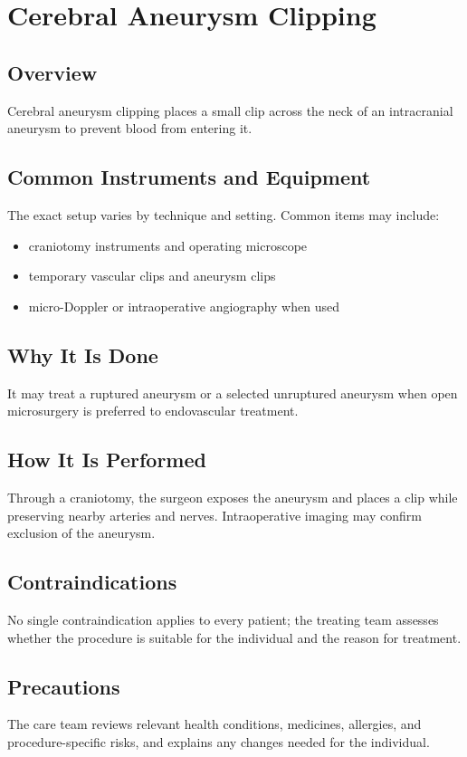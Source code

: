 \chapter{Cerebral Aneurysm Clipping}
\section*{Overview}
Cerebral aneurysm clipping places a small clip across the neck of an intracranial aneurysm to prevent blood from entering it.
\section*{Common Instruments and Equipment}
The exact setup varies by technique and setting. Common items may include:
\begin{itemize}[nosep,leftmargin=*]
  \item craniotomy instruments and operating microscope
  \item temporary vascular clips and aneurysm clips
  \item micro-Doppler or intraoperative angiography when used
\end{itemize}

\section*{Why It Is Done}
It may treat a ruptured aneurysm or a selected unruptured aneurysm when open microsurgery is preferred to endovascular treatment.
\section*{How It Is Performed}
Through a craniotomy, the surgeon exposes the aneurysm and places a clip while preserving nearby arteries and nerves. Intraoperative imaging may confirm exclusion of the aneurysm.
\section*{Contraindications}
No single contraindication applies to every patient; the treating team assesses whether the procedure is suitable for the individual and the reason for treatment.

\section*{Precautions}
The care team reviews relevant health conditions, medicines, allergies, and procedure-specific risks, and explains any changes needed for the individual.


